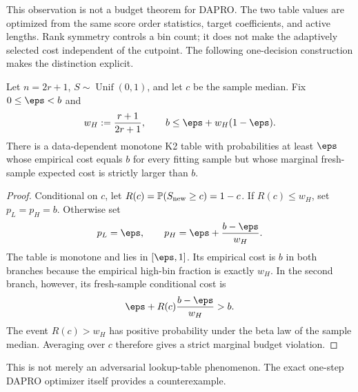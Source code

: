 This observation is not a budget theorem for DAPRO.  The two table values
are optimized from the same score order statistics, target coefficients, and
active lengths.  Rank symmetry controls a bin count; it does not make the
adaptively selected cost independent of the cutpoint.  The following
one-decision construction makes the distinction explicit.

\begin{proposition}
\label{prop:k2bc_median_counterexample}
Let $n=2r+1$, $S\sim\operatorname{Unif}(0,1)$, and let $c$ be the sample
median.  Fix $0\leq\eps<b$ and
\begin{equation}
    w_H:=\frac{r+1}{2r+1},
    \qquad b\leq \eps+w_H(1-\eps).
\end{equation}
There is a data-dependent monotone K2 table with probabilities at least
$\eps$ whose empirical cost equals $b$ for every fitting sample but whose
marginal fresh-sample expected cost is strictly larger than $b$.
\end{proposition}

\begin{proof}
Conditional on $c$, let $R(c)=\mathbb P(S_{\rm new}\geq c)=1-c$.  If
$R(c)\leq w_H$, set $p_L=p_H=b$.  Otherwise set
\begin{equation}
    p_L=\eps,
    \qquad
    p_H=\eps+\frac{b-\eps}{w_H}.
\end{equation}
The table is monotone and lies in $[\eps,1]$.  Its empirical cost is $b$ in
both branches because the empirical high-bin fraction is exactly $w_H$.
In the second branch, however, its fresh-sample conditional cost is
\begin{equation}
    \eps+R(c)\frac{b-\eps}{w_H}>b.
\end{equation}
The event $R(c)>w_H$ has positive probability under the beta law of the
sample median.  Averaging over $c$ therefore gives a strict marginal budget
violation.
\end{proof}

This is not merely an adversarial lookup-table phenomenon.  The exact
one-step DAPRO optimizer itself provides a counterexample.

